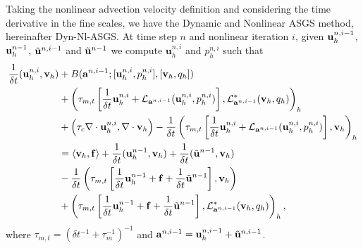 Taking the nonlinear advection velocity definition  and considering the time derivative in the fine scales, we have the Dynamic and Nonlinear ASGS method, hereinafter Dyn-Nl-ASGS. 
At time step $n$ and nonlinear iteration $i$, given ${\bf u}_h^{n,i-1}$, ${\bf u}_h^{n-1}$, $\tilde{{\bf u}}^{n,i-1}$ and $\tilde{{\bf u}}^{n-1}$ we compute $\mathbf{u}_h^{n,i}$ and $ p_h^{n,i} $ such that
\begin{align}
\label{eq-C4_Dyn-Nl-ASGS}
\frac{1}{\delta t}({\bf u}_h^{n,i},{\bf v}_h)
&+ B({\bf a}^{n,i-1};[{\bf u}_h^{n,i},p_h^{n,i}],[{\bf v}_h,q_h])
\\ \nonumber
&+\left(\tau_{m,t} \left[\frac{1}{\delta t}{\bf u}_h^{n,i}+ \mathcal{L}_{{\bf a}^{n,i-1}}({\bf u}_h^{n,i},p_h^{n,i})\right], \mathcal{L}^*_{{\bf a}^{n,i-1}}({\bf v}_h,q_h) \right)_h\\ \nonumber
&+\left(\tau_c\nabla\cdot{\bf u}_h^{n,i},\nabla\cdot{\bf v}_h\right)
-\frac{1}{\delta t} \left(\tau_{m,t}\left[\frac{1}{\delta t}{\bf u}_h^{n,i}+ \mathcal{L}_{{\bf a}^{n,i-1}}({\bf u}_h^{n,i},p_h^{n,i})\right],{\bf v}_h\right)_h \\\nonumber
&=\langle{\bf v}_h,\mathbf{f}\rangle
+\frac{1}{\delta t}({\bf u}_h^{n-1},{\bf v}_h)+\frac{1}{\delta t}(\tilde{{\bf u}}^{n-1},{\bf v}_h) \\\nonumber
&-\frac{1}{\delta t}\left(\tau_{m,t}\left[\frac{1}{\delta t}{\bf u}_h^{n-1}+\mathbf{f}+\frac{1}{\delta t}\tilde{{\bf u}}^{n-1}\right],{\bf v}_h\right) \\\nonumber
&+\left(\tau_{m,t}\left[\frac{1}{\delta t}{\bf u}_h^{n-1}+\mathbf{f}+\frac{1}{\delta t}\tilde{{\bf u}}^{n-1}\right],\mathcal{L}^*_{{\bf a}^{n,i-1}}({\bf v}_h,q_h) \right)_h,
\label{eq-C4_Dyn-Nl-ASGS}
\end{align}
where $\tau_{m,t}=\left(\delta t^{-1}+\tau_m^{-1}\right)^{-1}$ and ${\bf a}^{n,i-1}={\bf u}_h^{n,i-1}+\tilde{{\bf u}}^{n,i-1}$.

